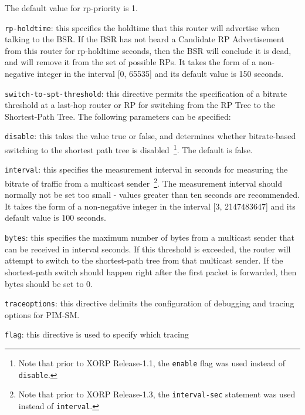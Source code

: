 \begin{description}
\begin{description}
\begin{description}
  The default value for {\stt rp-priority} is 1.
\item{\tt rp-holdtime}: this specifies the holdtime that this router
  will advertise when talking to the BSR.  If the BSR has not heard a
  Candidate RP Advertisement from this router for {\stt rp-holdtime}
  seconds, then the BSR will conclude it is dead, and will remove it
  from the set of possible RPs.  It takes the form of a non-negative
  integer in the interval [0, 65535] and its default value is 150 seconds.
\end{description}
\end{description}
\item{\tt switch-to-spt-threshold}: this directive permits the
  specification of a bitrate threshold at a last-hop router or RP
  for switching from the RP Tree to the Shortest-Path Tree.  The
  following parameters can be specified:
\begin{description}
\item{\tt disable}: this takes the value {\stt true} or {\stt false},
  and determines whether bitrate-based switching to the shortest
  path tree is disabled~\footnote{Note
  that prior to XORP Release-1.1, the {\tt enable} flag was used instead of
  {\tt disable}.}.  The default is false.
\item{\tt interval}: this specifies the measurement interval in
  seconds for measuring the bitrate of traffic from a  multicast
  sender~\footnote{Note that prior to XORP Release-1.3, the
  {\tt interval-sec} statement was used instead of {\tt interval}.}.
  The measurement interval should normally not be set too
  small - values greater than ten seconds are recommended.
  It takes the form of a non-negative integer in the interval
  [3, 2147483647] and its default value is 100 seconds.
\item{\tt bytes}: this specifies the maximum number of bytes from a
  multicast sender that can be received in {\stt interval}
  seconds.  If this threshold is exceeded, the router will attempt to
  switch to the shortest-path tree from that multicast sender.
  If the shortest-path switch should happen right after the first packet
  is forwarded, then {\stt bytes} should be set to 0.
\end{description}
\item{\tt traceoptions}: this directive delimits the configuration of
  debugging and tracing options for PIM-SM.
\begin{description}
\item{\tt flag}: this directive is used to specify which tracing

\end{description}
\end{description}
